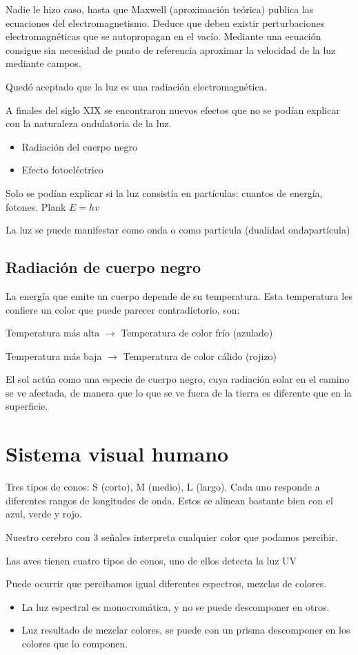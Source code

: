 Nadie le hizo caso, hasta que Maxwell (aproximación teórica) publica las ecuaciones del electromagnetismo. Deduce que deben existir perturbaciones electromagnéticas que se autopropagan en el vacío. Mediante una ecuación consigue sin necesidad de punto de referencia aproximar la velocidad de la luz mediante campos.

Quedó aceptado que la luz es una radiación electromagnética.

A finales del siglo XIX se encontraron nuevos efectos que no se podían explicar con la naturaleza ondulatoria de la luz.
\begin{itemize}
	\item Radiación del cuerpo negro
	\item Efecto fotoeléctrico
\end{itemize}

Solo se podían explicar si la luz consistía en partículas: cuantos de energía, fotones. Plank $E=hv$

La luz se puede manifestar como onda o como partícula (dualidad ondapartícula)

\subsection{Radiación de cuerpo negro}
La energía que emite un cuerpo depende de su temperatura. Esta temperatura les confiere un color que puede parecer contradictorio, son:

Temperatura más alta $\rightarrow$ Temperatura de color frío (azulado)

Temperatura más baja $\rightarrow$ Temperatura de color cálido (rojizo)

El sol actúa como una especie de cuerpo negro, cuya radiación solar en el camino se ve afectada, de manera que lo que se ve fuera de la tierra es diferente que en la superficie.

\section{Sistema visual humano}
Tres tipos de conos: S (corto), M (medio), L (largo). Cada uno responde a diferentes rangos de longitudes de onda. Estos se alinean bastante bien con el azul, verde y rojo.

Nuestro cerebro con 3 señales interpreta cualquier color que podamos percibir.

Las aves tienen cuatro tipos de conos, uno de ellos detecta la luz UV

Puede ocurrir que percibamos igual diferentes espectros, mezclas de colores.
\begin{itemize}
	\item La luz espectral es monocromática, y no se puede descomponer en otros.
	\item Luz resultado de mezclar colores, se puede con un prisma descomponer en los colores que lo componen.
\end{itemize}

